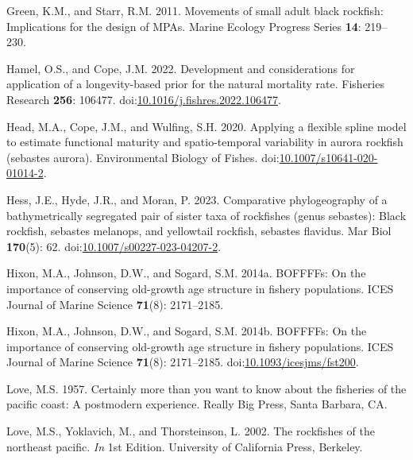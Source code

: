 \documentclass[11pt,
  letterpaper,
]{article}
\newlength{\cslhangindent}
\newenvironment{CSLReferences}[2] %
 {%
  \setlength{\parindent}{0pt}
  \ifodd #1 \everypar{\setlength{\hangindent}{\cslhangindent}}\ignorespaces\fi
  \ifnum #2 > 0
  \setlength{\parskip}{#2\baselineskip}
  \fi
 }%
 {}
\begin{document}
\begin{CSLReferences}{1}{0}
\leavevmode{}%
Green, K.M., and Starr, R.M. 2011. Movements of small adult black rockfish: Implications for the design of MPAs. Marine Ecology Progress Series \textbf{14}: 219--230.

\leavevmode{}%
Hamel, O.S., and Cope, J.M. 2022. Development and considerations for application of a longevity-based prior for the natural mortality rate. Fisheries Research \textbf{256}: 106477. doi:\href{https://doi.org/10.1016/j.fishres.2022.106477}{10.1016/j.fishres.2022.106477}.

\leavevmode{}%
Head, M.A., Cope, J.M., and Wulfing, S.H. 2020. Applying a flexible spline model to estimate functional maturity and spatio-temporal variability in aurora rockfish (sebastes aurora). Environmental Biology of Fishes. doi:\href{https://doi.org/10.1007/s10641-020-01014-2}{10.1007/s10641-020-01014-2}.

\leavevmode{}%
Hess, J.E., Hyde, J.R., and Moran, P. 2023. Comparative phylogeography of a bathymetrically segregated pair of sister taxa of rockfishes (genus sebastes): Black rockfish, sebastes melanops, and yellowtail rockfish, sebastes flavidus. Mar Biol \textbf{170}(5): 62. doi:\href{https://doi.org/10.1007/s00227-023-04207-2}{10.1007/s00227-023-04207-2}.

\leavevmode{}%
Hixon, M.A., Johnson, D.W., and Sogard, S.M. 2014a. BOFFFFs: On the importance of conserving old-growth age structure in fishery populations. ICES Journal of Marine Science \textbf{71}(8): 2171--2185.

\leavevmode{}%
Hixon, M.A., Johnson, D.W., and Sogard, S.M. 2014b. {BOFFFFs}: On the importance of conserving old-growth age structure in fishery populations. {ICES} Journal of Marine Science \textbf{71}(8): 2171--2185. doi:\href{https://doi.org/10.1093/icesjms/fst200}{10.1093/icesjms/fst200}.

\leavevmode{}%
Love, M.S. 1957. Certainly more than you want to know about the fisheries of the pacific coast: A postmodern experience. Really Big Press, Santa Barbara, CA.

\leavevmode{}%
Love, M.S., Yoklavich, M., and Thorsteinson, L. 2002. The rockfishes of the northeast pacific. \emph{In} 1st Edition. University of California Press, Berkeley.


\end{CSLReferences}
\end{document}
